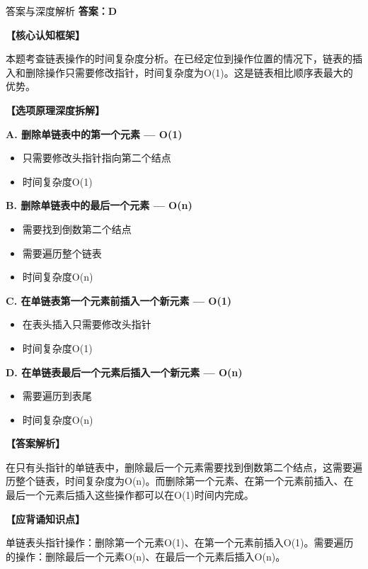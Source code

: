 \documentclass[12pt, a4paper]{article}
\newenvironment{bluebox}{\begin{framed}\begin{minipage}{\linewidth}}{\end{minipage}\end{framed}}
\begin{document}
\begin{bluebox}{答案与深度解析}
	\textbf{答案：D}

	\textbf{【核心认知框架】}

	本题考查链表操作的时间复杂度分析。在已经定位到操作位置的情况下，链表的插入和删除操作只需要修改指针，时间复杂度为O(1)。这是链表相比顺序表最大的优势。

	\textbf{【选项原理深度拆解】}

	\item \textbf{A. 删除单链表中的第一个元素 — O(1)}
	\begin{itemize}
		\item 只需要修改头指针指向第二个结点
		\item 时间复杂度O(1)
	\end{itemize}

	\item \textbf{B. 删除单链表中的最后一个元素 — O(n)}
	\begin{itemize}
		\item 需要找到倒数第二个结点
		\item 需要遍历整个链表
		\item 时间复杂度O(n)
	\end{itemize}

	\item \textbf{C. 在单链表第一个元素前插入一个新元素 — O(1)}
	\begin{itemize}
		\item 在表头插入只需要修改头指针
		\item 时间复杂度O(1)
	\end{itemize}

	\item \textbf{D. 在单链表最后一个元素后插入一个新元素 — O(n)}
	\begin{itemize}
		\item 需要遍历到表尾
		\item 时间复杂度O(n)
	\end{itemize}

	\textbf{【答案解析】}

	在只有头指针的单链表中，删除最后一个元素需要找到倒数第二个结点，这需要遍历整个链表，时间复杂度为O(n)。而删除第一个元素、在第一个元素前插入、在最后一个元素后插入这些操作都可以在O(1)时间内完成。

	\textbf{【应背诵知识点】}

	单链表头指针操作：删除第一个元素O(1)、在第一个元素前插入O(1)。需要遍历的操作：删除最后一个元素O(n)、在最后一个元素后插入O(n)。
\end{bluebox}
\end{document}
